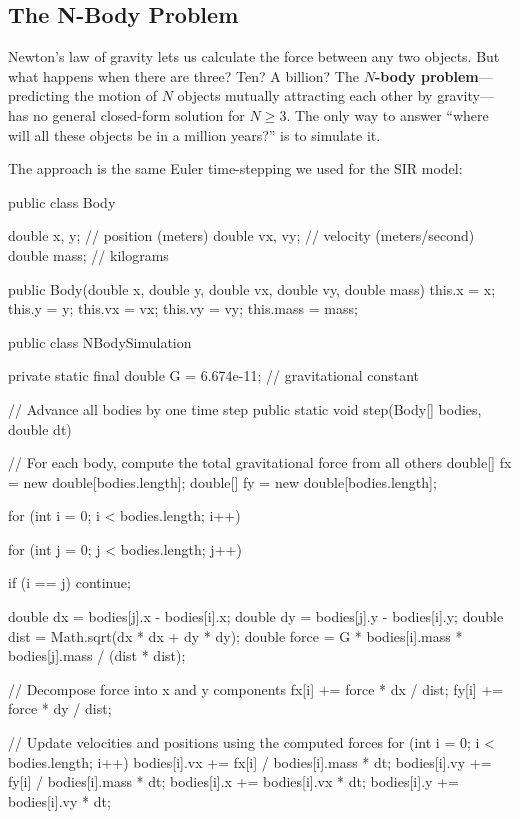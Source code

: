 \documentclass[11pt,letterpaper]{article}
\newcommand{\keyterm}[1]{\textbf{\textcolor{cssecondary}{#1}}}
\begin{document}
\subsection{The N-Body Problem}

Newton's law of gravity lets us calculate the force between any two objects. But what happens when there are three? Ten? A billion? The \keyterm{$N$-body problem}---predicting the motion of $N$ objects mutually attracting each other by gravity---has no general closed-form solution for $N \geq 3$. The only way to answer ``where will all these objects be in a million years?'' is to simulate it.

The approach is the same Euler time-stepping we used for the SIR model:

\begin{javacode}
public class Body {
    double x, y;       // position (meters)
    double vx, vy;     // velocity (meters/second)
    double mass;       // kilograms

    public Body(double x, double y, double vx, double vy, double mass) {
        this.x = x; this.y = y;
        this.vx = vx; this.vy = vy;
        this.mass = mass;
    }
}

public class NBodySimulation {
    private static final double G = 6.674e-11; // gravitational constant

    // Advance all bodies by one time step
    public static void step(Body[] bodies, double dt) {
        // For each body, compute the total gravitational force from all others
        double[] fx = new double[bodies.length];
        double[] fy = new double[bodies.length];

        for (int i = 0; i < bodies.length; i++) {
            for (int j = 0; j < bodies.length; j++) {
                if (i == j) continue;

                double dx = bodies[j].x - bodies[i].x;
                double dy = bodies[j].y - bodies[i].y;
                double dist = Math.sqrt(dx * dx + dy * dy);
                double force = G * bodies[i].mass * bodies[j].mass
                               / (dist * dist);

                // Decompose force into x and y components
                fx[i] += force * dx / dist;
                fy[i] += force * dy / dist;
            }
        }

        // Update velocities and positions using the computed forces
        for (int i = 0; i < bodies.length; i++) {
            bodies[i].vx += fx[i] / bodies[i].mass * dt;
            bodies[i].vy += fy[i] / bodies[i].mass * dt;
            bodies[i].x  += bodies[i].vx * dt;
            bodies[i].y  += bodies[i].vy * dt;
        }
    }
}
\end{javacode}
\end{document}
